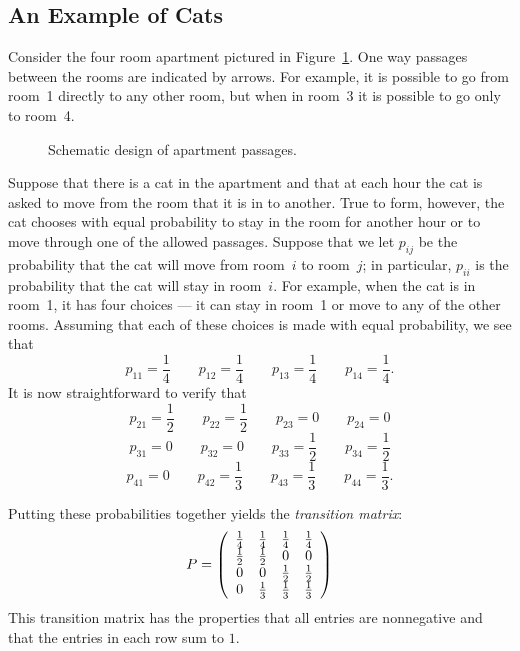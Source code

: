 \subsection*{An Example of Cats}

Consider the four room apartment pictured in Figure~\ref{F:apart}.  One way
passages between the rooms are indicated by arrows.  For example, it is
possible to go from room~1 directly to any other room, but when in room~3
it is possible to go only to room~4.

\begin{figure}[htb]
        \centerline{%
        }
        \caption{Schematic design of apartment passages.}
        \label{F:apart}
\end{figure}

Suppose that there is a cat in the apartment and that at each hour the cat is
asked to move from the room that it is in to another.  True to form, however,
the cat chooses with equal probability to stay in the room for another hour
or to move through one of the allowed passages.  Suppose that we let $p_{ij}$
be the probability that the cat will move from room~$i$ to room~$j$; in
particular, $p_{ii}$ is the probability that the cat will stay in room~$i$.
For example, when the cat is in room~1, it has four choices  --- it can
stay in room~1 or move to any of the other rooms.  Assuming that each of
these choices is made with equal probability, we see that
\[
p_{11} = \frac{1}{4} \qquad p_{12} = \frac{1}{4} \qquad p_{13} =
\frac{1}{4} \qquad p_{14} = \frac{1}{4}.
\]
It is now straightforward to verify that
\[
p_{21} = \frac{1}{2} \qquad p_{22} = \frac{1}{2} \qquad p_{23} = 0
\qquad p_{24} = 0
\]
\[
p_{31} = 0 \qquad p_{32} = 0 \qquad p_{33} =
\frac{1}{2} \qquad p_{34} = \frac{1}{2}
\]
\[
p_{41} = 0 \qquad p_{42} = \frac{1}{3} \qquad p_{43} =
\frac{1}{3} \qquad p_{44} = \frac{1}{3}.
\]

Putting these probabilities together yields the
{\em transition matrix}:
\begin{equation*} \label{E:Pexamp}
P = \left(\begin{array}{cccc}
\frac{1}{4} & \frac{1}{4} & \frac{1}{4} & \frac{1}{4} \\
\mbox{$\frac{1}{2}$} & \mbox{$\frac{1}{2}$} & 0 & 0 \\
 0 & 0 & \mbox{$\frac{1}{2}$} & \mbox{$\frac{1}{2}$}\\
0 & \frac{1}{3} & \frac{1}{3} & \frac{1}{3}
\end{array}\right)
\end{equation*}
This transition matrix has the properties that all entries are nonnegative
and that the entries in each row sum to $1$.


